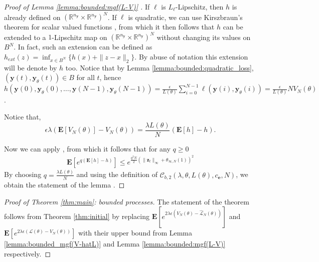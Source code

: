\documentclass{article}
\def\rve{{\mathbf{e}}}
\def\rvy{{\mathbf{y}}}
\def\rvz{{\mathbf{z}}}
\newcommand{\y}{\mathbf{y}}
\newcommand{\bE}{\mathbf{E}}
\begin{document}
\begin{proof}[Proof of Lemma \ref{lemma:bounded:mgf(L-V)} ]
If $\ell$ is $L_{\ell}$-Lipschitz, then $h$ is already defined on  $(\mathbb{R}^{n_{\rvy}} \times \mathbb{R}^{n_{\rvy}})^N$. If $\ell$ is quadratic, 
we can use Kirszbraun's theorem for scalar valued functions
\cite[2.10.44,page 202]{Federer1996},
from which it then follows that $h$ can be extended to a $1$-Lipschitz map on $(\mathbb{R}^{n_{\rvy}} \times \mathbb{R}^{n_{\rvy}})^N$
without changing its values on $B^N$.  In fact, such an 
extension can be defined as 
$h_{ext}(z)=\inf_{x \in B^N} \{h(x) + \|z-x\|_2\}$.
By abuse of notation this extension will be denote by $h$ too. 
Notice that by Lemma \ref{lemma:bounded:quadratic_loss}, $(\y(t),\y_{\theta}(t)) \in B$ for all $t$, hence
$h(\y(0),\y_{\theta}(0),\ldots,\y(N-1),\y_{\theta}(N-1)) = \frac{\epsilon}{L(\theta)} \sum_{i=0}^{N-1} \ell(\y(i),\y_{\theta}(i))=\frac{\epsilon}{L(\theta)} N V_N(\theta)$.


Notice that, 
\[\epsilon \lambda(\bE[V_N(\theta)]- V_N(\theta))=\frac{\lambda L(\theta)}{N} \left ( \bE[h]-h \right ).\]

 Now we can apply \cite[Theorem 6.6]{alquier2013prediction}, from which it follows that for any $q\geq 0$
 \begin{align}
     \bE[e^{q(\bE[h]-h)}]\leq e^{\frac{q^2N}{2} (\|\rvz_t\|_\infty+\theta_{\infty,N}(1))^2}
 \end{align}
By  
choosing $q=\frac{\lambda L(\theta)}{N}$ and using the definition of $\mathcal{C}_{b,2}(\lambda,\theta,L(\theta),c_\rve,N)$, we obtain the statement of the lemma .
\end{proof}
\begin{proof}[Proof of Theorem \ref{thm:main}: bounded processes]
  The statement of the theorem follows from Theorem \ref{thm:initial}
  by replacing $\bE[e^{2\lambda \epsilon(V_N(\theta)-\hat{\mathcal{L}}_N(\theta))}]$ and $\bE[e^{2\lambda \epsilon (\mathcal{L}(\theta)-V_N(\theta))}]$ with their upper bound from
  Lemma \ref{lemma:bounded_mgf(V-hatL)}  and Lemma \ref{lemma:bounded:mgf(L-V)} respectively. 
\end{proof}
\end{document}
